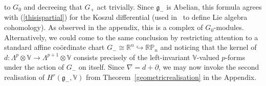 \documentclass[pdftex]{sigma}
\begin{document}
to $G_0$ and decreeing that $G_+$ act trivially. Since ${\mathfrak{g}}_-$ is
Abelian, this formula agrees with (\ref{thisispartial}) for the Koszul
dif\/ferential (used in~\cite{ce} to def\/ine Lie algebra cohomology). As observed
in the appendix, this is a complex of $G_0$-modules. Alternatively, we could
come to the same conclusion by restricting attention to a standard af\/f\/ine
co\"ordinate chart $G_-\cong{\mathbb{R}}^n\hookrightarrow{\mathbb{RP}}_n$ and
noticing that the kernel of
$d:\Lambda^p\otimes{\mathbb{V}}\to\Lambda^{p+1}\otimes{\mathbb{V}}$ consists
precisely of the left-invariant ${\mathbb{V}}$-valued $p$-forms under the
action of $G_-$ on itself. Since $\nabla=d+\partial$, we may now invoke the
second realisation of $H^r({\mathfrak{g}}_-,{\mathbb{V}})$ from
Theorem~\ref{geometricrealisation} in the Appendix.
\end{document}
